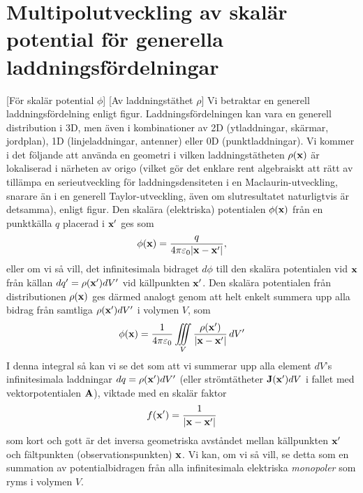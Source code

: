 \section{Multipolutveckling av skal{\"a}r potential f{\"o}r generella laddningsf{\"o}rdelningar}
[F{\"o}r skal{\"a}r potential $\phi$]
[Av laddningst{\"a}thet $\rho$]
Vi betraktar en generell laddningsf{\"o}rdelning enligt figur.
Laddningsf{\"ordelningen} kan vara en generell distribution i 3D, men {\"a}ven
i kombinationer av 2D (ytladdningar, sk{\"a}rmar, jordplan),
1D (linjeladdningar, antenner) eller 0D (punktladdningar). Vi kommer i det
f{\"o}ljande att anv{\"a}nda en geometri i vilken laddningst{\"a}theten
$\rho({\bf x})$ {\"a}r lokaliserad i n{\"a}rheten av origo (vilket g{\"o}r
det enklare rent algebraiskt att r{\"a}tt av till{\"a}mpa en serieutveckling
f{\"o}r laddningsdensiteten i en Maclaurin-utveckling, snarare {\"a}n i en
generell Taylor-utveckling, {\"a}ven om slutresultatet naturligtvis {\"a}r
detsamma), enligt figur.
\noindent
Den skal{\"a}ra (elektriska) potentialen $\phi({\bf x})$ fr{\aa}n en
punktk{\"a}lla $q$ placerad i ${\bf x}'$ ges som
$$
  \phi({\bf x})={{q}\over{4\pi\varepsilon_0|{\bf x}-{\bf x}'|}},
$$
eller om vi s{\aa} vill, det infinitesimala bidraget $d\phi$ till den
skal{\"a}ra potentialen vid ${\bf x}$ fr{\aa}n k{\"a}llan
$dq'=\rho({\bf x}')dV'$ vid k{\"a}llpunkten ${\bf x}'$.
\noindent
Den skal{\"a}ra potentialen fr{\aa}n distributionen $\rho({\bf x})$ ges
d{\"a}rmed analogt genom att helt enkelt summera upp alla bidrag fr{\aa}n
samtliga $\rho({\bf x}')dV'$ i volymen $V$, som
$$
  \phi({\bf x})={{1}\over{4\pi\varepsilon_0}}
     \iiint_{V}{{\rho({\bf x}')}\over{|{\bf x}-{\bf x}'|}}\,dV'
$$
I denna integral s{\aa} kan vi se det som att vi summerar upp alla element
$dV$'s infinitesimala laddningar $dq=\rho({\bf x}')dV'$ (eller
str{\"o}mt{\"a}theter ${\bf J}({\bf x}')dV$ i fallet med vektorpotentialen
${\bf A}$), viktade med en skal{\"a}r faktor
$$
  f({\bf x}')={{1}\over{|{\bf x}-{\bf x}'|}}
$$
som kort och gott {\"a}r det inversa geometriska avst{\aa}ndet mellan
k{\"a}llpunkten ${\bf x}'$ och f{\"a}ltpunkten (observationspunkten) ${\bf x}$.
Vi kan, om vi s{\aa} vill, se detta som en summation av potentialbidragen
fr{\aa}n alla infinitesimala elektriska {\it monopoler} som ryms i volymen
$V$.

